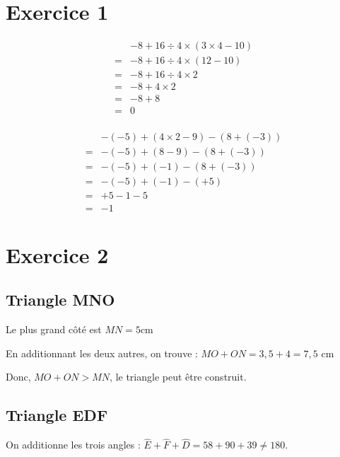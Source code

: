 \section*{Exercice 1}

\begin{minipage}{0.45\textwidth}
    \begin{align*}
        &-8+16\div 4\times (3\times4-10)\\
        =&-8+16\div 4\times (12-10)\\
        =&-8+16\div 4\times 2\\
        =&-8+4\times 2\\
        =&-8+8\\
        =&0\\
    \end{align*}
    
\end{minipage}
\hfil
\vrule
\hfil
\begin{minipage}{0.45\textwidth}
    \begin{align*}
        &-(-5)+(4\times2-9)-(8+(-3))\\
        =&-(-5)+(8-9)-(8+(-3))\\
        =&-(-5)+(-1)-(8+(-3))\\
        =&-(-5)+(-1)-(+5)\\
        =&+5-1-5\\
        =&-1
    \end{align*}
\end{minipage}

\section*{Exercice 2}

\subsection*{Triangle MNO}  
Le plus grand côté est $MN=5$cm

En additionnant les deux autres, on trouve : $MO+ON=3,5+4=7,5$ cm

Donc, $MO+ON>MN$, le triangle peut être construit.

\subsection*{Triangle EDF}  
On additionne les trois angles : $\widehat{E}+\widehat{F}+\widehat{D}=58+90+39\neq180$.

